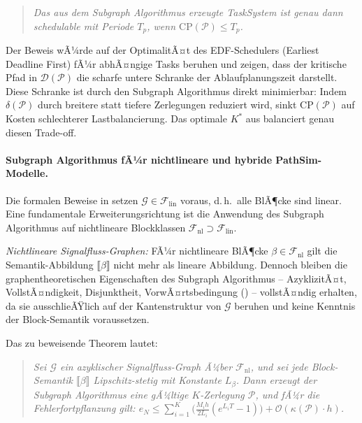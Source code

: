 ﻿\documentclass[12pt,a4paper]{article}
\theoremstyle{definition}
\begin{document}
\begin{quote}
\textit{Das aus dem Subgraph Algorithmus erzeugte TaskSystem ist genau
dann schedulable mit Periode $T_p$, wenn
$\mathrm{CP}(\mathcal{P}) \leq T_p$.}
\end{quote}

Der Beweis wÃ¼rde auf der OptimalitÃ¤t des EDF-Schedulers (Earliest
Deadline First) fÃ¼r abhÃ¤ngige Tasks beruhen und zeigen, dass der
kritische Pfad in $\mathcal{D}(\mathcal{P})$ die scharfe untere
Schranke der Ablaufplanungszeit darstellt. Diese Schranke ist
durch den Subgraph Algorithmus direkt minimierbar: Indem
$\delta(\mathcal{P})$ durch breitere statt tiefere Zerlegungen
reduziert wird, sinkt $\mathrm{CP}(\mathcal{P})$ auf Kosten
schlechterer Lastbalancierung. Das optimale $K^*$ aus
 balanciert genau diesen Trade-off.

\paragraph{Subgraph Algorithmus fÃ¼r nichtlineare und hybride PathSim-Modelle.}
Die formalen Beweise in  setzen
$\mathcal{G} \in \mathcal{F}_{\mathrm{lin}}$ voraus, d.\,h.\ alle BlÃ¶cke
sind linear. Eine fundamentale Erweiterungsrichtung ist die Anwendung
des Subgraph Algorithmus auf nichtlineare Blockklassen
$\mathcal{F}_{\mathrm{nl}} \supset \mathcal{F}_{\mathrm{lin}}$.

\emph{Nichtlineare Signalfluss-Graphen:}
FÃ¼r nichtlineare BlÃ¶cke $\beta \in \mathcal{F}_{\mathrm{nl}}$ gilt die
Semantik-Abbildung $\llbracket \beta \rrbracket$ nicht mehr als lineare
Abbildung. Dennoch bleiben die graphentheoretischen Eigenschaften des
Subgraph Algorithmus -- AzyklizitÃ¤t, VollstÃ¤ndigkeit, Disjunktheit,
VorwÃ¤rtsbedingung () -- vollstÃ¤ndig erhalten, da
sie ausschlieÃŸlich auf der Kantenstruktur von $\mathcal{G}$ beruhen
und keine Kenntnis der Block-Semantik voraussetzen.

Das zu beweisende Theorem lautet:
\begin{quote}
\textit{Sei $\mathcal{G}$ ein azyklischer Signalfluss-Graph Ã¼ber
$\mathcal{F}_{\mathrm{nl}}$, und sei jede Block-Semantik
$\llbracket\beta\rrbracket$ Lipschitz-stetig mit Konstante $L_\beta$.
Dann erzeugt der Subgraph Algorithmus eine gÃ¼ltige $K$-Zerlegung
$\mathcal{P}$, und fÃ¼r die Fehlerfortpflanzung gilt:
$e_N \leq \sum_{i=1}^K \bigl(\frac{M_i h}{2L_i}(e^{L_i T}-1)\bigr) + \mathcal{O}(\kappa(\mathcal{P}) \cdot h)$.}
\end{quote}
\end{document}
